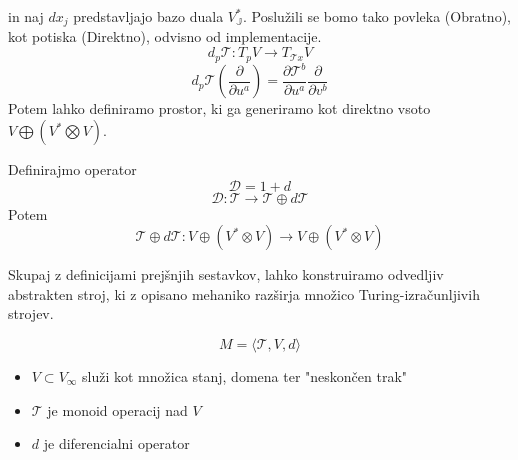 \documentclass{article}
\newcommand{\JJ}{\mathbb{J}}
\newcommand{\T}{\mathcal{T}}
\newcommand{\D}{\mathcal{D}}
\begin{document}

in naj $dx_j$ predstavljajo bazo duala $V_\JJ^{*}$. Poslužili se bomo tako povleka (Obratno), kot potiska (Direktno), odvisno od implementacije.
\begin{equation}\label{eq:pushfirward}
 d_p\T: T_pV\to T_{\T x}V
\end{equation}
\begin{equation}\label{eq:pullback}
 d_p\T(\frac{\partial}{\partial u^a})=\frac{\partial\T^b}{\partial u^a}\frac{\partial}{\partial v^b}
\end{equation}
Potem lahko definiramo prostor, ki ga generiramo kot direktno vsoto $V\bigoplus (V^*\bigotimes V)$.
  
  Definirajmo operator 
  \begin{equation}
  \D=1+d
  \end{equation}
  \begin{equation}\label{eq:dirSumFun}
  \D:\T\to\T\oplus d\T
  \end{equation}
  Potem
  \begin{equation}\label{eq:dirSumV}
    \T\oplus d\T: V\oplus (V^*\otimes V)\to V\oplus (V^*\otimes V)
    \end{equation}
  
  Skupaj z definicijami prejšnjih sestavkov, lahko konstruiramo odvedljiv abstrakten stroj, ki z opisano mehaniko razširja množico Turing-izračunljivih strojev.
  
  \begin{equation}\label{eq:dTuring}
  M=\langle\T, V, d\rangle
  \end{equation}

 \begin{itemize}
 \item
 $V\subset V_\infty$ služi kot množica stanj, domena ter "neskončen trak"
 \item
 $\T$ je monoid operacij nad $V$
 \item
 $d$ je diferencialni operator
 \end{itemize}
 
\end{document}
